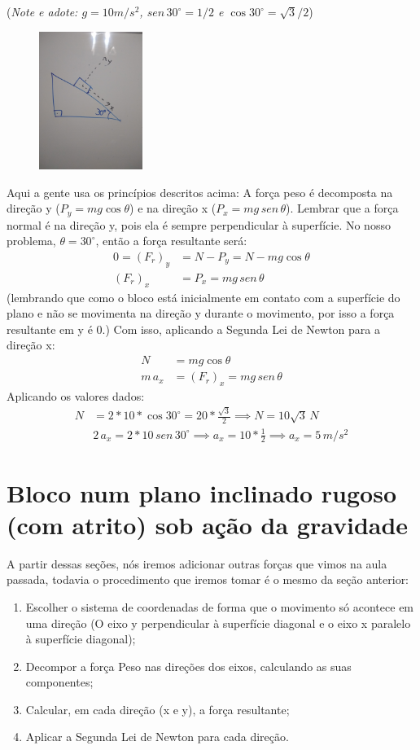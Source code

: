 \documentclass[12pt]{extarticle}
\newcommand{\<}{\langle}
\renewcommand{\>}{\rangle}
\theoremstyle{definition}
\begin{document}
(\textit{Note e adote: $g=10m/s^2$, $sen\,30^\circ = 1/2$ e $\cos30^\circ = \sqrt{3}/2$})
\begin{figure}[H]
    \centering
    \includegraphics[width=0.3\textwidth]{IMG_20200602_002611925.jpg}
    \label{fig:ex_1}
\end{figure}

Aqui a gente usa os princípios descritos acima: A força peso é decomposta na direção y ($P_y=mg\cos\theta$) e na direção x ($P_x=mg\,sen\,\theta$). Lembrar que a força normal é na direção y, pois ela é sempre perpendicular à superfície. No nosso problema, $\theta =30^\circ$, então a força resultante será:
\begin{align*}
    0=(F_r)_y &= N - P_y = N - mg\cos\theta\\
    (F_r)_x &= P_x = mg\,sen\,\theta
\end{align*}
(lembrando que como o bloco está inicialmente em contato com a superfície do plano e não se movimenta na direção y durante o movimento, por isso a força resultante em y é 0.) Com isso, aplicando a Segunda Lei de Newton para a direção x:
\begin{align*}
    N &= mg\cos\theta\\
    m\,a_x&= (F_r)_x = mg\,sen\,\theta
\end{align*}
Aplicando os valores dados:
\begin{align*}
    N &= 2*10*\cos30^\circ = 20*\frac{\sqrt{3}}{2} \implies N = 10\sqrt{3}\, N\\
    &2\,a_x = 2*10\,sen\,30^\circ \implies a_x = 10*\frac{1}{2} \implies a_x = 5\,m/s^2
\end{align*}
\section{Bloco num plano inclinado rugoso (com atrito) sob ação da gravidade}

A partir dessas seções, nós iremos adicionar outras forças que vimos na aula passada, todavia o procedimento que iremos tomar é o mesmo da seção anterior: 
\begin{enumerate}
    \item Escolher o sistema de coordenadas de forma que o movimento só acontece em uma direção (O eixo y perpendicular à superfície diagonal e o eixo x paralelo à superfície diagonal);
    \item Decompor a força Peso nas direções dos eixos, calculando as suas componentes;
    \item Calcular, em cada direção (x e y), a força resultante;
    \item Aplicar a Segunda Lei de Newton para cada direção.
\end{enumerate}
\end{document}

